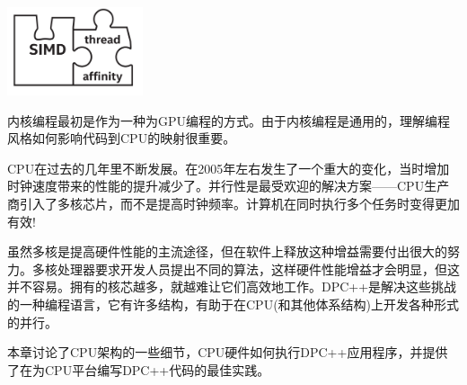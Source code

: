 \begin{center}
	\includegraphics[width=0.3\textwidth]{content/chapter-16/images/1}
\end{center}

内核编程最初是作为一种为GPU编程的方式。由于内核编程是通用的，理解编程风格如何影响代码到CPU的映射很重要。\par

CPU在过去的几年里不断发展。在2005年左右发生了一个重大的变化，当时增加时钟速度带来的性能的提升减少了。并行性是最受欢迎的解决方案——CPU生产商引入了多核芯片，而不是提高时钟频率。计算机在同时执行多个任务时变得更加有效!\par

虽然多核是提高硬件性能的主流途径，但在软件上释放这种增益需要付出很大的努力。多核处理器要求开发人员提出不同的算法，这样硬件性能增益才会明显，但这并不容易。拥有的核芯越多，就越难让它们高效地工作。DPC++是解决这些挑战的一种编程语言，它有许多结构，有助于在CPU(和其他体系结构)上开发各种形式的并行。\par

本章讨论了CPU架构的一些细节，CPU硬件如何执行DPC++应用程序，并提供了在为CPU平台编写DPC++代码的最佳实践。\par






